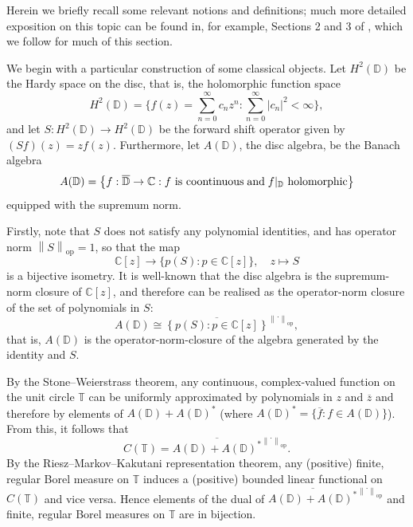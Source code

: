 \documentclass[11pt,reqno]{amsart}
\newcommand\norm[1]{\left\lVert#1\right\rVert}
\def\CC{\mathbb{C}}
\def\DD{\mathbb{D}}
\def\TT{\mathbb{T}}
\theoremstyle{definition}
\numberwithin{equation}{section}
\begin{document}
Herein we briefly recall some relevant notions and definitions; much more detailed exposition on this topic can be found in, for example, Sections 2 and 3 of \cite{JM22a}, which we follow for much of this section.

We begin with a particular construction of some classical objects. Let \(H^2(\DD)\) be the Hardy space on the disc, that is, the holomorphic function space
\[
    H^2(\DD) = \{f(z) = \sum_{n = 0}^{\infty} c_n z^n : \sum_{n=0}^{\infty} \lvert c_n \rvert^2 < \infty \},
\]
and let \(S : H^2(\DD) \to H^2(\DD)\) be the forward shift operator given by \((Sf)(z) = zf(z)\). Furthermore, let \(A(\DD)\), the disc algebra, be the Banach algebra
\[
    A(\DD) = \left\{f: \overline{\DD} \to \CC : f \text{ is coontinuous}  \; {\rm and} \; f\vert_{\DD} \text{ holomorphic}\right\}
\]
equipped with the supremum norm.

Firstly, note that \(S\) does not satisfy any polynomial identities, and has operator norm \(\norm{S}_{\mathrm{op}} = 1\), so that the map
\[
    \CC[z] \to \{p(S) : p \in \CC[z] \}, \quad z \mapsto S
\]
is a bijective isometry. It is well-known that the disc algebra is the supremum-norm closure of \(\CC[z]\), and therefore can be realised as the operator-norm closure of the set of polynomials in \(S\):
\[
    A(\DD) \cong \overline{\left\{ p(S) : p \in \CC[z] \right\}}^{\norm{\cdot}_{\mathrm{op}}},
\]
that is, \(A(\DD)\) is the operator-norm-closure of the algebra generated by the identity and \(S\).

By the Stone--Weierstrass theorem, any continuous, complex-valued function on the unit circle \(\TT\) can be uniformly approximated by polynomials in \(z\) and \(\overline{z}\) and therefore by elements of \(A(\DD) + A(\DD)^*\) (where \(A(\DD)^* = \{\overline{f} : f \in A(\DD)\}\)). From this, it follows that
\[
    C(\TT) = \overline{A(\DD) + A(\DD)^*}^{\norm{\cdot}_{\mathrm{op}}}.
\]
By the Riesz--Markov--Kakutani representation theorem, any (positive) finite, regular Borel measure on \(\TT\) induces a (positive) bounded linear functional on \(C(\TT)\) and vice versa. Hence elements of the dual of \(\overline{A(\DD) + A(\DD)^*}^{\norm{\cdot}_{\mathrm{op}}}\) and finite, regular Borel measures on \(\TT\) are in bijection.
\end{document}

